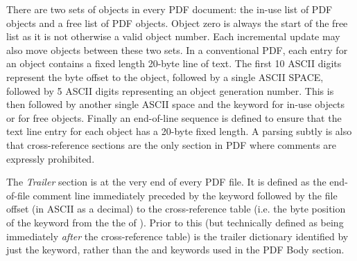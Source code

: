 There are two sets of
objects in every PDF document: the in-use list of PDF objects and a free list
of PDF objects. Object zero is always the start of the free list as it is not
otherwise a valid object number. Each incremental update may also move objects between these two sets.
In a conventional PDF, each entry for an object contains a fixed length 20-byte line of text.
The first 10 ASCII digits represent the byte offset to the object, followed by a single ASCII SPACE, 
followed by 5 ASCII digits representing an object generation number. This is then followed by
another single ASCII space and the keyword  for in-use objects or  for free objects.
Finally an end-of-line sequence is defined to ensure that the text line entry for each object has 
a 20-byte fixed length. A parsing subtly is also that cross-reference sections are the only section 
in PDF where comments are expressly prohibited.

The \emph{Trailer} section is at the very end of every PDF file. 
It is defined as the end-of-file comment line  immediately
preceded by the  keyword followed by the file offset (in ASCII as a decimal) to 
the cross-reference table (i.e. the byte position of the  keyword 
from the the \lstcd{\%} of ). Prior to this (but technically 
defined as being immediately \emph{after} the cross-reference table) is the trailer dictionary
identified by just the  keyword, rather than the  and 
keywords used in the PDF Body section.


